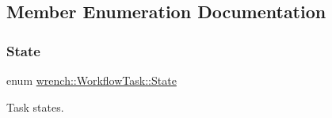 \subsection{Member Enumeration Documentation}
\mbox{\label{classwrench_1_1_workflow_task_a1184f3d7aea21e1c87a9b17e84f1f92a}} 
\subsubsection{\texorpdfstring{State}{State}}
{\footnotesize\ttfamily enum \hyperlink{classwrench_1_1_workflow_task_a1184f3d7aea21e1c87a9b17e84f1f92a}{wrench\+::\+Workflow\+Task\+::\+State}}



Task states. 

